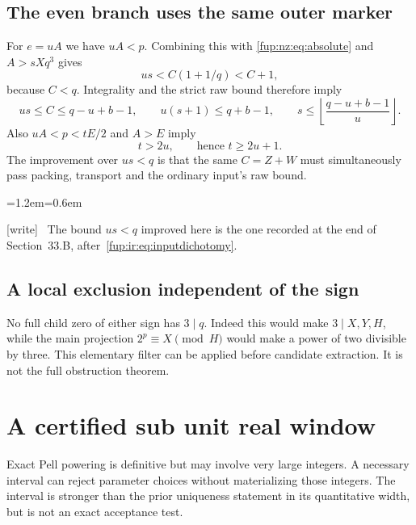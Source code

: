 \documentclass[11pt,letterpaper]{article}
\theoremstyle{definition}\newtheorem{definition}[theorem]{Definition}
\theoremstyle{remark}\newtheorem{remark}[theorem]{Remark}
\newcommand{\wtag}{\textup{[write]}}
\newenvironment{writenote}{\par\smallskip\begin{list}{}{\leftmargin=1.2em\rightmargin=0.6em}\item[]\small\wtag\ }{\end{list}\smallskip}
\begin{document}
\subsection{The even branch uses the same outer marker}
For $e=uA$ we have $uA<p$. Combining this with \eqref{fup:nz:eq:absolute} and $A>sXq^3$ gives
\[
 us<C(1+1/q)<C+1,
\]
because $C<q$. Integrality and the strict raw bound therefore imply
\begin{equation}\label{fup:nz:eq:even}
 us\le C\le q-u+b-1,\qquad
 u(s+1)\le q+b-1,\qquad
 s\le\left\lfloor\frac{q-u+b-1}{u}\right\rfloor.
\end{equation}
Also $uA<p<tE/2$ and $A>E$ imply
\begin{equation}\label{fup:nz:eq:event}
 t>2u,\qquad\text{hence }t\ge2u+1.
\end{equation}
The improvement over $us<q$ is that the same $C=Z+W$ must simultaneously pass packing, transport and the ordinary input's raw bound.
\begin{writenote}
The bound $us<q$ improved here is the one recorded at the end of Section~33.B, after~\eqref{fup:ir:eq:inputdichotomy}.
\end{writenote}

\subsection{A local exclusion independent of the sign}
No full child zero of either sign has $3\mid q$. Indeed this would make $3\mid X,Y,H$, while the main projection $2^p\equiv X\pmod H$ would make a power of two divisible by three. This elementary filter can be applied before candidate extraction. It is not the full obstruction theorem.

\section{A certified sub unit real window}\label{fup:nz:sec:window}
Exact Pell powering is definitive but may involve very large integers. A necessary interval can reject parameter choices without materializing those integers. The interval is stronger than the prior uniqueness statement in its quantitative width, but is not an exact acceptance test.
\end{document}

